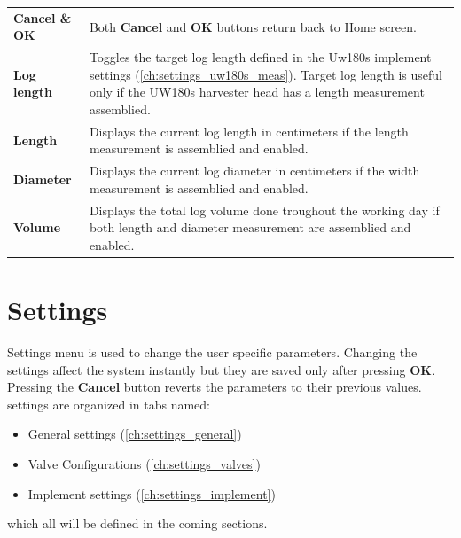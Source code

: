 \documentclass[12pt,a4paper,english]{uvmanual}
\begin{document}

\begin{tabular}{ L{0.2\textwidth} L{0.66\textwidth} }
\textbf{Cancel \& OK} & Both \textbf{Cancel} and \textbf{OK} buttons return back to Home screen. \\
\textbf{Log length} & Toggles the target log length defined in the Uw180s implement settings (\autoref{ch:settings_uw180s_meas}). Target log length is useful only if the UW180s harvester head has a length measurement assemblied. \\
\textbf{Length} & Displays the current log length in centimeters if the length measurement is assemblied and enabled. \\
\textbf{Diameter} & Displays the current log diameter in centimeters if the width measurement is assemblied and enabled. \\
\textbf{Volume} & Displays the total log volume done troughout the working day if both length and diameter measurement are assemblied and enabled. \\
\end{tabular}


\chapter{Settings}\label{ch:settings}

Settings menu is used to change the user specific parameters. Changing the settings affect the system instantly but they are saved only after pressing \textbf{OK}. Pressing the \textbf{Cancel} button reverts the parameters to their previous values. settings are organized in tabs named:

\begin{itemize}
 \item General settings (\autoref{ch:settings_general})
 \item Valve Configurations (\autoref{ch:settings_valves})
 \item Implement settings (\autoref{ch:settings_implement})
\end{itemize}

which all will be defined in the coming sections.

\end{document}
